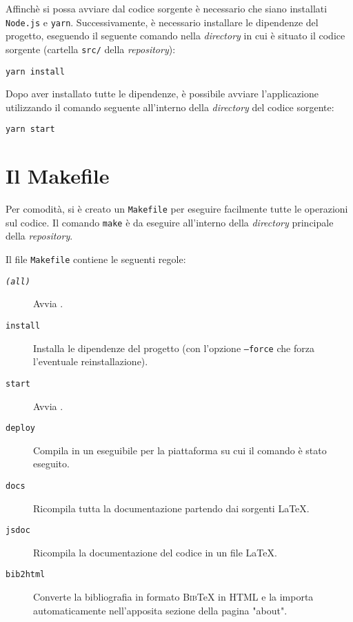 Affinchè si possa avviare \ProjectTitle{} dal codice sorgente è necessario che
siano installati \texttt{Node.js} e \texttt{yarn}. Successivamente, è necessario
installare le dipendenze del progetto, eseguendo il seguente comando nella
\textit{directory} in cui è situato il codice sorgente (cartella \texttt{src/}
della \textit{repository}):

\begin{lstlisting}
yarn install
\end{lstlisting}

Dopo aver installato tutte le dipendenze, è possibile avviare l'applicazione
utilizzando il comando seguente all'interno della \textit{directory} del codice
sorgente:

\begin{lstlisting}
yarn start
\end{lstlisting}

\section{Il Makefile}

Per comodità, si è creato un \texttt{Makefile} per eseguire facilmente tutte le
operazioni sul codice. Il comando \lstinline|make| è da eseguire all'interno
della \textit{directory} principale della \textit{repository}.

Il file \texttt{Makefile} contiene le seguenti regole:
\begin{description}
	\item[\texttt{\textit{(all)}}] Avvia \ProjectTitle{}.
	\item[\texttt{install}] Installa le dipendenze del progetto (con l'opzione
	\texttt{--force} che forza l'eventuale reinstallazione).
	\item[\texttt{start}] Avvia \ProjectTitle{}.
	\item[\texttt{deploy}] Compila \ProjectTitle{} in un eseguibile per la
	piattaforma su cui il comando è stato eseguito.
	\item[\texttt{docs}] Ricompila tutta la documentazione partendo dai sorgenti
	\LaTeX.
	\item[\texttt{jsdoc}] Ricompila la documentazione del codice in un file
	\LaTeX.
	\item[\texttt{bib2html}] Converte la bibliografia in formato
	\textsc{Bib}\TeX{} in HTML e la importa automaticamente nell'apposita
	sezione della pagina "about".
\end{description}